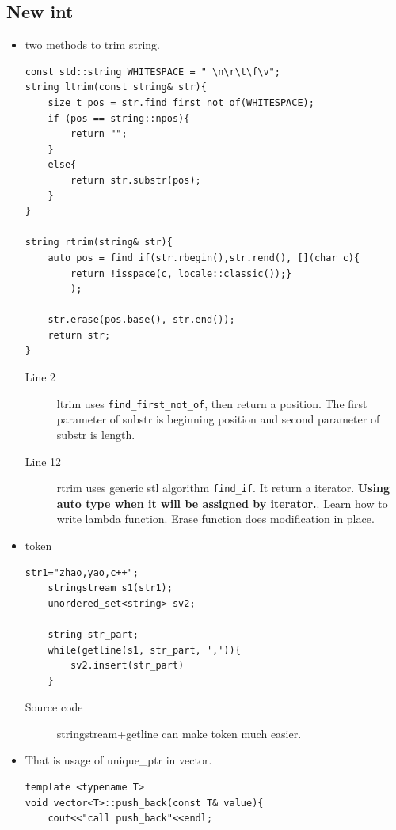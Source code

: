 \documentclass[a4paper,12pt,twoside]{book}
\begin{document}
\subsection{New int}
\begin{itemize}
	\item two methods to trim string.
	
\begin{lstlisting}[numbers=none]
const std::string WHITESPACE = " \n\r\t\f\v";
string ltrim(const string& str){
	size_t pos = str.find_first_not_of(WHITESPACE);
	if (pos == string::npos){
		return "";
	}
	else{
		return str.substr(pos);
	}
}
		
string rtrim(string& str){
	auto pos = find_if(str.rbegin(),str.rend(), [](char c){ 
		return !isspace(c, locale::classic());}
		);
		
	str.erase(pos.base(), str.end());
	return str;
}
\end{lstlisting}
	\begin{description}
		\item[Line 2] ltrim uses \texttt{find\_first\_not\_of}, then return a position. The first parameter of substr is beginning position and second parameter of substr is length. 
		\item[Line 12] rtrim uses generic stl algorithm \texttt{find\_if}. It return a iterator. \textbf{Using auto type when it will be assigned by iterator.}. Learn how to write lambda function.  Erase function does modification in place. 
	\end{description}
	
	\item token
\begin{lstlisting}[numbers=none]
	str1="zhao,yao,c++";
	stringstream s1(str1);
	unordered_set<string> sv2;
		
	string str_part;
	while(getline(s1, str_part, ',')){
		sv2.insert(str_part)
	}
\end{lstlisting}
	
	\begin{description}
		\item[Source code] stringstream+getline can make token much easier.
	\end{description}

\item That is usage of unique\_ptr in vector. 

\begin{lstlisting}[numbers=none]
template <typename T>
void vector<T>::push_back(const T& value){
	cout<<"call push_back"<<endl;
	

\end{lstlisting}
\end{itemize}
\end{document}
